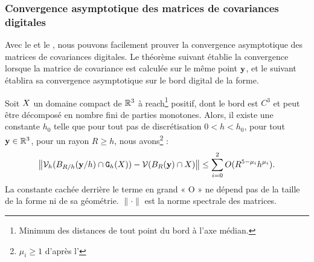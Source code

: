 \subsubsection{Convergence asymptotique des matrices de covariances digitales}
%
Avec le  et le
, nous pouvons facilement prouver la
convergence asymptotique des matrices de covariances digitales. Le théorème
suivant établie la convergence lorsque la matrice de covariance est calculée sur
le même point $\mathbf{y}$, et le suivant établira sa convergence asymptotique sur le
bord digital de la forme.
%
\begin{theorem}
  \label{thm:conv-cov-matrix}
%
  Soit $X$ un domaine compact de $\mathbb{R}^3$ à reach\footnote{Minimum des distances de tout point du bord à
  l'axe médian.} positif, dont le bord est $C^3$ et peut
  être décomposé en nombre fini de parties monotones. Alors, il existe une
  constante $h_0$ telle que pour tout pas de discrétisation $0 < h < h_0$, pour
  tout $\mathbf{y} \in \mathbb{R}^3$, pour un rayon $R \ge h$, nous avons\footnote{$\mu_i \ge
  1$ d'après l'} :
%
  \begin{equation}
    \left \| \mathcal{V}_{h}( B_{R/h}(\mathbf{y}/h) \cap  \mathtt{G}_{h}(X) ) - \mathcal{V}( B_{R}(\mathbf{y}) \cap X )\right \| \le \sum_{i=0}^2 O(R^{5-\mu_i}h^{\mu_i}).
  \end{equation}
%
  La constante cachée derrière le terme en grand « O » ne dépend pas de la
  taille de la forme ni de sa géométrie. $\|\cdot\|$ est la norme spectrale des
  matrices.
%
\end{theorem}
